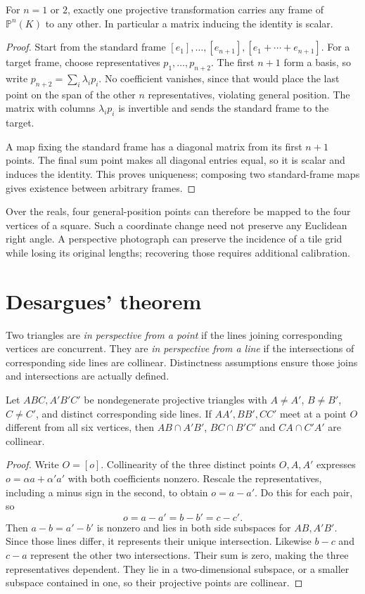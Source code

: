 \begin{proposition}[Frames]\label{geometry:prop:frames}
For $n=1$ or $2$, exactly one projective transformation carries any frame of $\mathbb P^n(K)$ to any other. In particular a matrix inducing the identity is scalar.
\end{proposition}
\begin{proof}
Start from the standard frame $[e_1],\ldots,[e_{n+1}],[e_1+\cdots+e_{n+1}]$. For a target frame, choose representatives $p_1,\ldots,p_{n+2}$. The first $n+1$ form a basis, so write $p_{n+2}=\sum_i\lambda_ip_i$. No coefficient vanishes, since that would place the last point on the span of the other $n$ representatives, violating general position. The matrix with columns $\lambda_ip_i$ is invertible and sends the standard frame to the target.

A map fixing the standard frame has a diagonal matrix from its first $n+1$ points. The final sum point makes all diagonal entries equal, so it is scalar and induces the identity. This proves uniqueness; composing two standard-frame maps gives existence between arbitrary frames.
\end{proof}

Over the reals, four general-position points can therefore be mapped to the four vertices of a square. Such a coordinate change need not preserve any Euclidean right angle. A perspective photograph can preserve the incidence of a tile grid while losing its original lengths; recovering those requires additional calibration.

\section{Desargues' theorem}

Two triangles are \emph{in perspective from a point} if the lines joining corresponding vertices are concurrent. They are \emph{in perspective from a line} if the intersections of corresponding side lines are collinear. Distinctness assumptions ensure those joins and intersections are actually defined.

\begin{theorem}[Desargues]\label{geometry:thm:desargues}
Let $ABC,A'B'C'$ be nondegenerate projective triangles with $A\ne A'$, $B\ne B'$, $C\ne C'$, and distinct corresponding side lines. If $AA',BB',CC'$ meet at a point $O$ different from all six vertices, then
$AB\cap A'B'$, $BC\cap B'C'$ and $CA\cap C'A'$ are collinear.
\end{theorem}
\begin{proof}
Write $O=[o]$. Collinearity of the three distinct points $O,A,A'$ expresses $o=\alpha a+\alpha'a'$ with both coefficients nonzero. Rescale the representatives, including a minus sign in the second, to obtain $o=a-a'$. Do this for each pair, so
\[
o=a-a'=b-b'=c-c'.
\]
Then $a-b=a'-b'$ is nonzero and lies in both side subspaces for $AB,A'B'$. Since those lines differ, it represents their unique intersection. Likewise $b-c$ and $c-a$ represent the other two intersections. Their sum is zero, making the three representatives dependent. They lie in a two-dimensional subspace, or a smaller subspace contained in one, so their projective points are collinear.
\end{proof}

